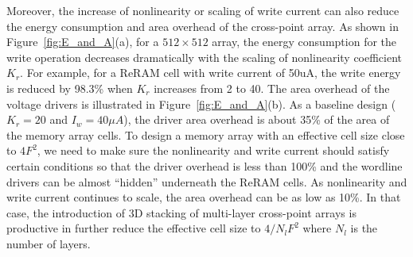 Moreover, the increase of nonlinearity or scaling of write current can
also reduce the energy consumption and area overhead of the cross-point
array. As shown in Figure~\ref{fig:E_and_A}(a), for a $512 \times 512$
array, the energy consumption for the write operation decreases
dramatically with the scaling of nonlinearity coefficient $K_r$. For
example, for a ReRAM cell with write current of 50uA, the write energy is
reduced by 98.3\% when $K_r$ increases from 2 to 40. The area overhead of
the voltage drivers is illustrated in Figure~\ref{fig:E_and_A}(b). As a
baseline design ($K_r=20$ and $I_w=40\mu A$), the driver area overhead is
about 35\% of the area of the memory array cells. To design a memory array
with an effective cell size close to $4F^2$, we need to make sure the
nonlinearity and write current should satisfy certain conditions so that
the driver overhead is less than 100\% and the wordline drivers can be
almost ``hidden'' underneath the ReRAM cells. As nonlinearity and write
current continues to scale, the area overhead can be as low as 10\%. In
that case, the introduction of 3D stacking of multi-layer cross-point
arrays is productive in further reduce the effective cell size to $4/N_l
F^2$ where $N_l$ is the number of layers.



